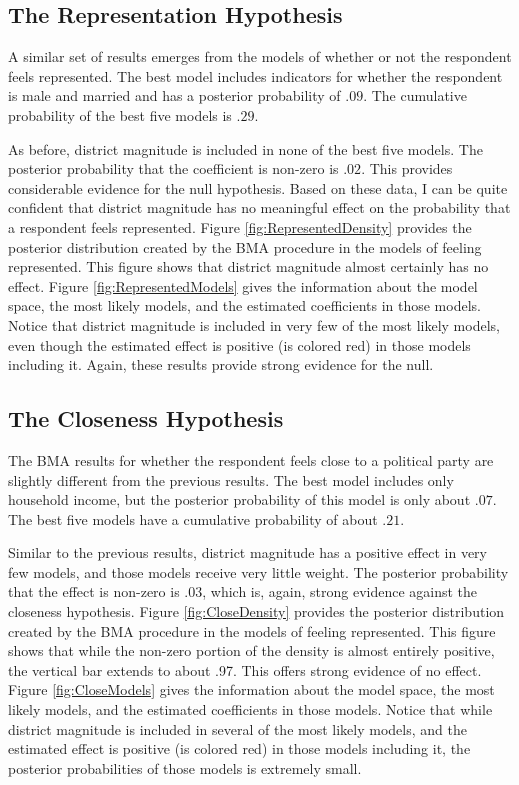 \documentclass[12pt]{article}
\begin{document}
\subsection*{The Representation Hypothesis}

A similar set of results emerges from the models of whether or not the respondent feels represented. The best model includes indicators for whether the respondent is male and married and has a posterior probability of $.09$. The cumulative probability of the best five models is $.29$. 

As before, district magnitude is included in none of the best five models. The posterior probability that the coefficient is non-zero is $.02$. This provides considerable evidence for the null hypothesis. Based on these data, I can be quite confident that district magnitude has no meaningful effect on the probability that a respondent feels represented. Figure \ref{fig:RepresentedDensity} provides the posterior distribution created by the BMA procedure in the models of feeling represented. This figure shows that district magnitude almost certainly has no effect. Figure \ref{fig:RepresentedModels} gives the information about the model space, the most likely models, and the estimated coefficients in those models. Notice that district magnitude is included in very few of the most likely models, even though the estimated effect is positive (is colored red) in those models including it. Again, these results provide strong evidence for the null. 

\subsection*{The Closeness Hypothesis}

The BMA results for whether the respondent feels close to a political party are slightly different from the previous results. The best model includes only household income, but the posterior probability of this model is only about $.07$. The best five models have a cumulative probability of about $.21$.

Similar to the previous results, district magnitude has a positive effect in very few models, and those models receive very little weight. The posterior probability that the effect is non-zero is $.03$, which is, again, strong evidence against the closeness hypothesis. Figure \ref{fig:CloseDensity} provides the posterior distribution created by the BMA procedure in the models of feeling represented. This figure shows that while the non-zero portion of the density is almost entirely positive, the vertical bar extends to about .97. This offers strong evidence of no effect. Figure \ref{fig:CloseModels} gives the information about the model space, the most likely models, and the estimated coefficients in those models. Notice that while district magnitude is included in several of the most likely models, and the estimated effect is positive (is colored red) in those models including it, the posterior probabilities of those models is extremely small.
\end{document}
